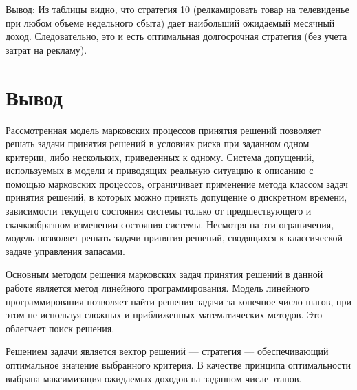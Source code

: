 \documentclass[14pt,a4paper,report]{report}
\begin{document}
	Вывод: Из таблицы видно, что стратегия 10 (релкамировать товар на телевиденье при любом объеме недельного сбыта) дает наибольший ожидаемый месячный доход. Следовательно, это и есть оптимальная долгосрочная стратегия (без учета затрат на рекламу).

	
\section{Вывод}

Рассмотренная модель марковских процессов принятия решений позволяет решать задачи принятия решений в условиях риска при заданном одном критерии, либо нескольких, приведенных к одному. Система допущений, используемых в модели и приводящих реальную ситуацию к описанию с помощью
марковских процессов, ограничивает применение метода классом задач принятия решений, в которых можно принять допущение о дискретном времени, зависимости текущего состояния системы только от предшествующего и скачкообразном изменении состояния системы. Несмотря на эти ограничения, модель позволяет решать задачи принятия решений, сводящихся к классической задаче управления запасами.

Основным методом решения марковских задач принятия решений в данной работе является метод линейного программирования. Модель линейного программирования позволяет найти решения задачи за конечное число шагов, при этом не используя сложных и приближенных математических методов. Это облегчает поиск решения.

Решением задачи является вектор решений — стратегия — обеспечивающий оптимальное значение выбранного критерия. В качестве принципа оптимальности выбрана максимизация ожидаемых доходов на заданном числе этапов.
\end{document}
